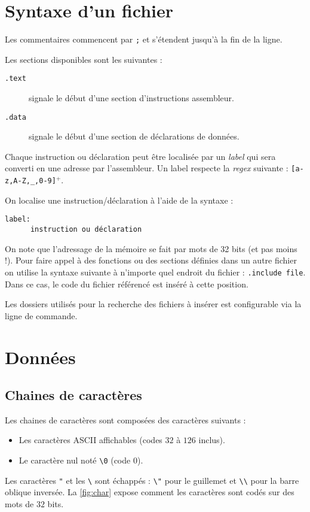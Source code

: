 \documentclass[french, 12pt]{article}
\begin{document}
\section*{Syntaxe d'un fichier}
Les commentaires commencent par \texttt{;} et s'étendent jusqu'à la fin de la ligne.

Les sections disponibles sont les suivantes :
\begin{description}
      \item[\texttt{.text}] signale le début d'une section d'instructions assembleur.
      \item[\texttt{.data}] signale le début d'une section de déclarations de données.
\end{description}


Chaque instruction ou déclaration peut être localisée par un \emph{label} qui
sera converti en une adresse par l'assembleur. Un label respecte la \emph{regex} suivante :
\texttt{[a-z,A-Z,\_,0-9]$^{+}$}.

On localise une instruction/déclaration à l'aide de la syntaxe :
\begin{verbatim}
label:
      instruction ou déclaration
\end{verbatim}


On note que l'adressage de la mémoire se fait par mots de 32 bits (et pas moins !).
Pour faire appel à des fonctions ou des sections définies dans un autre fichier
on utilise la syntaxe suivante à n'importe quel endroit du fichier :
\verb|.include file|. Dans ce cas, le code du fichier référencé est inséré
à cette position.

Les dossiers utilisés pour la recherche des fichiers à insérer est configurable
via la ligne de commande.

\section*{Données}

\subsection*{Chaines de caractères}

Les chaines de caractères sont composées des caractères suivants :
\begin{itemize}
      \item Les caractères ASCII affichables (codes $32$ à $126$ inclus).
      \item Le caractère nul noté \verb|\0| (code $0$).
\end{itemize}
Les caractères \texttt{"} et les \texttt{\textbackslash} sont échappés :
\texttt{\textbackslash{}"} pour le guillemet et
\texttt{\textbackslash{}\textbackslash{}} pour la barre oblique inversée.
La \autoref{fig:char} expose comment les caractères sont codés sur des
mots de $32$ bits.
\end{document}
